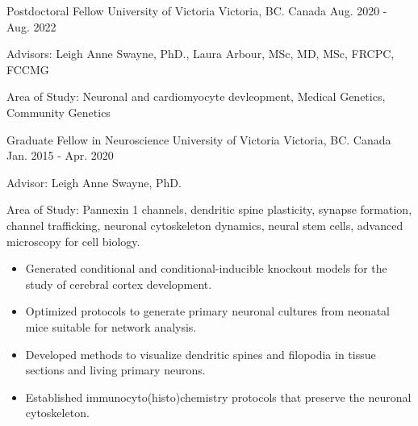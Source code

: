 

\begin{cventries}

  \cventry
    {Postdoctoral Fellow} %
    {University of Victoria} %
    {Victoria, BC. Canada} %
    {Aug. 2020 - Aug. 2022} %
    {
      \begin{cvitems} %
        \item {Advisors: Leigh Anne Swayne, PhD., Laura Arbour, MSc, MD, MSc, FRCPC, FCCMG}
        \item {Area of Study: Neuronal and cardiomyocyte devleopment, Medical Genetics, Community Genetics}
      \end{cvitems}
    }
  \cventry
    {Graduate Fellow in Neuroscience} %
    {University of Victoria} %
    {Victoria, BC. Canada} %
    {Jan. 2015 - Apr. 2020} %
    {
      \begin{cvitems} %
        \item {Advisor: Leigh Anne Swayne, PhD.}
        \item {Area of Study: Pannexin 1 channels, dendritic spine plasticity, synapse formation, channel trafficking, neuronal cytoskeleton dynamics, neural stem cells, advanced microscopy for cell biology.}
        \begin{itemize}
          \begin{itemize}
            \item {Generated conditional and conditional-inducible knockout models for the study of cerebral cortex development.}
            \item {Optimized protocols to generate primary neuronal cultures from neonatal mice suitable for network analysis.}
            \item {Developed methods to visualize dendritic spines and filopodia in tissue sections and living primary neurons.}
            \item {Established immunocyto(histo)chemistry protocols that preserve the neuronal cytoskeleton.}

\end{itemize}
\end{itemize}
\end{cvitems}}
\end{cventries}
